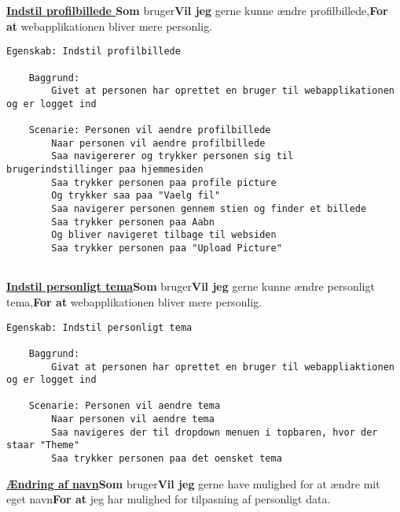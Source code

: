 \noindent\textbf{\underline{Indstil profilbillede }}\newline \textbf{Som} bruger\newline \textbf{Vil jeg} gerne kunne ændre profilbillede,\newline \textbf{For at} webapplikationen bliver mere personlig.

\begin{lstlisting}[language=Gherkin]
Egenskab: Indstil profilbillede

    Baggrund:
        Givet at personen har oprettet en bruger til webapplikationen og er logget ind
        
    Scenarie: Personen vil aendre profilbillede
        Naar personen vil aendre profilbillede
        Saa navigererer og trykker personen sig til brugerindstillinger paa hjemmesiden
        Saa trykker personen paa profile picture
        Og trykker saa paa "Vaelg fil"
        Saa navigerer personen gennem stien og finder et billede
        Saa trykker personen paa Aabn
        Og bliver navigeret tilbage til websiden
        Saa trykker personen paa "Upload Picture"
        

\end{lstlisting}

\noindent\textbf{\underline{Indstil personligt tema}}\newline \textbf{Som} bruger\newline \textbf{Vil jeg} gerne kunne ændre personligt tema,\newline \textbf{For at} webapplikationen bliver mere personlig.

\begin{lstlisting}[language=Gherkin]
Egenskab: Indstil personligt tema

    Baggrund:
        Givat at personen har oprettet en bruger til webappliaktionen og er logget ind
        
    Scenarie: Personen vil aendre tema
        Naar personen vil aendre tema
        Saa navigeres der til dropdown menuen i topbaren, hvor der staar "Theme"
        Saa trykker personen paa det oensket tema

\end{lstlisting}


\noindent\textbf{\underline{Ændring af navn}}\newline \textbf{Som} bruger\newline \textbf{Vil jeg} gerne have mulighed for at ændre mit eget navn\newline \textbf{For at} jeg har mulighed for tilpasning af personligt data.

